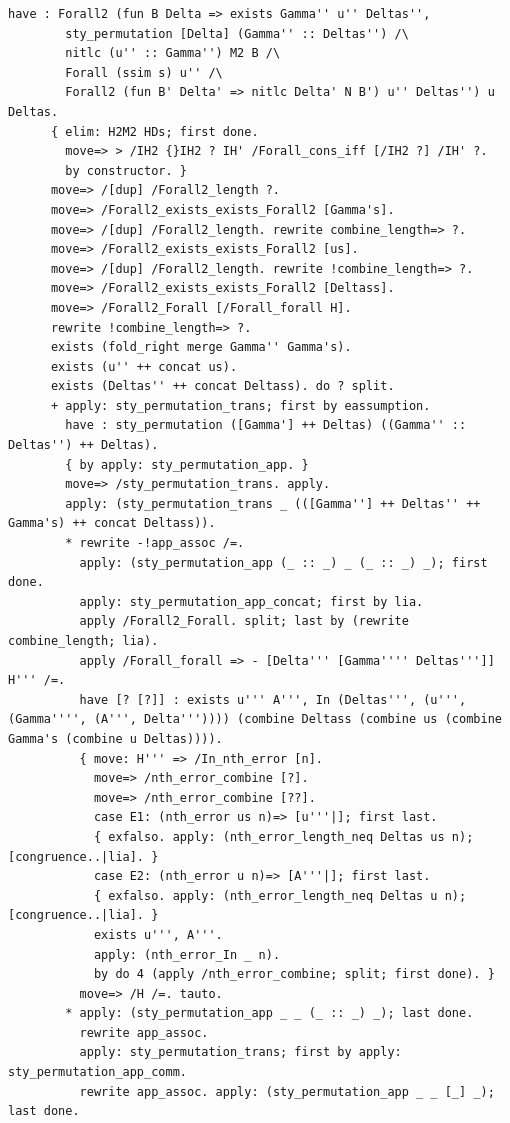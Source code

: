 \documentclass[10pt,a4paper]{article}
\begin{document}
\begin{lstlisting}[style=authorcoq]
      have : Forall2 (fun B Delta => exists Gamma'' u'' Deltas'',
        sty_permutation [Delta] (Gamma'' :: Deltas'') /\
        nitlc (u'' :: Gamma'') M2 B /\
        Forall (ssim s) u'' /\
        Forall2 (fun B' Delta' => nitlc Delta' N B') u'' Deltas'') u Deltas.
      { elim: H2M2 HDs; first done.
        move=> > /IH2 {}IH2 ? IH' /Forall_cons_iff [/IH2 ?] /IH' ?.
        by constructor. }
      move=> /[dup] /Forall2_length ?.
      move=> /Forall2_exists_exists_Forall2 [Gamma's].
      move=> /[dup] /Forall2_length. rewrite combine_length=> ?.
      move=> /Forall2_exists_exists_Forall2 [us].
      move=> /[dup] /Forall2_length. rewrite !combine_length=> ?.
      move=> /Forall2_exists_exists_Forall2 [Deltass].
      move=> /Forall2_Forall [/Forall_forall H].
      rewrite !combine_length=> ?.
      exists (fold_right merge Gamma'' Gamma's).
      exists (u'' ++ concat us).
      exists (Deltas'' ++ concat Deltass). do ? split.
      + apply: sty_permutation_trans; first by eassumption.
        have : sty_permutation ([Gamma'] ++ Deltas) ((Gamma'' :: Deltas'') ++ Deltas).
        { by apply: sty_permutation_app. }
        move=> /sty_permutation_trans. apply.
        apply: (sty_permutation_trans _ (([Gamma''] ++ Deltas'' ++ Gamma's) ++ concat Deltass)).
        * rewrite -!app_assoc /=.
          apply: (sty_permutation_app (_ :: _) _ (_ :: _) _); first done.
          apply: sty_permutation_app_concat; first by lia.
          apply /Forall2_Forall. split; last by (rewrite combine_length; lia).
          apply /Forall_forall => - [Delta''' [Gamma'''' Deltas''']] H''' /=.
          have [? [?]] : exists u''' A''', In (Deltas''', (u''', (Gamma'''', (A''', Delta''')))) (combine Deltass (combine us (combine Gamma's (combine u Deltas)))).
          { move: H''' => /In_nth_error [n].
            move=> /nth_error_combine [?].
            move=> /nth_error_combine [??].
            case E1: (nth_error us n)=> [u'''|]; first last.
            { exfalso. apply: (nth_error_length_neq Deltas us n); [congruence..|lia]. }
            case E2: (nth_error u n)=> [A'''|]; first last.
            { exfalso. apply: (nth_error_length_neq Deltas u n); [congruence..|lia]. }
            exists u''', A'''.
            apply: (nth_error_In _ n).
            by do 4 (apply /nth_error_combine; split; first done). }
          move=> /H /=. tauto.
        * apply: (sty_permutation_app _ _ (_ :: _) _); last done.
          rewrite app_assoc.
          apply: sty_permutation_trans; first by apply: sty_permutation_app_comm.
          rewrite app_assoc. apply: (sty_permutation_app _ _ [_] _); last done.

\end{lstlisting}
\end{document}
